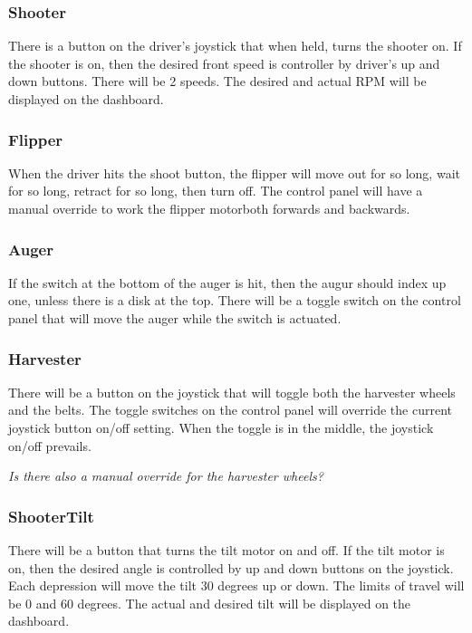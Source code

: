 \documentclass[]{article}
\begin{document}
\subsubsection{Shooter}
There is a button on the driver's joystick that when held, turns the shooter on. If the shooter is on, then the desired front speed is controller by driver's up and down buttons. There will be 2 speeds. The desired and actual RPM will be displayed on the dashboard.

\subsubsection{Flipper}
When the driver hits the shoot button, the flipper will move out for so long, wait for so long, retract for so long, then turn off. The control panel will have a manual override to work the flipper motorboth forwards and backwards.

\subsubsection{Auger}
If the switch at the bottom of the auger is hit, then the augur should index up one, unless there is a disk at the top.
There will be a toggle switch on the control panel that will move the auger while the switch is actuated.

\subsubsection{Harvester}
There will be a button on the joystick that will toggle both the harvester wheels and the belts. The toggle switches on the control panel will override the current joystick  button on/off setting. When the toggle is in the middle, the joystick on/off prevails.

\emph{Is there also a manual override for the harvester wheels?}

\subsubsection{ShooterTilt}
There will be a button that turns the tilt motor on and off. If the tilt motor is on, then the desired angle is controlled by up and down buttons on the joystick. Each depression will move the tilt 30 degrees up or down. The limits of travel will be 0 and 60 degrees. The actual and desired tilt will be displayed on the dashboard.

\newpage
\end{document}
